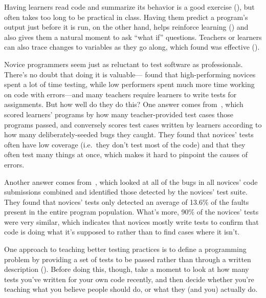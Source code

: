 Having learners read code and summarize its behavior is a good exercise (),
but often takes too long to be practical in class.
Having them predict a program's output just before it is run,
on the other hand,
helps reinforce learning ()
and also gives them a natural moment to ask ``what if'' questions.
Teachers or learners can also trace changes to variables as they go along,
which \cite{Cunn2017} found was effective ().


Novice programmers seem just as reluctant to test software as professionals.
There's no doubt that doing it is valuable---\cite{Cart2017} found that
high-performing novices spent a lot of time testing,
while low performers spent much more time working on code with errors---and many teachers
require learners to write tests for assignments.
But how well do they do this?
One answer comes from~\cite{Bria2015},
which scored learners' programs by how many teacher-provided test cases those programs passed,
and conversely scores test cases written by learners according to how many deliberately-seeded bugs they caught.
They found that novices' tests often have low coverage (i.e.\ they don't test most of the code)
and that they often test many things at once, which makes it hard to pinpoint the causes of errors.

Another answer comes from~\cite{Edwa2014b},
which looked at all of the bugs in all novices' code submissions combined
and identified those detected by the novices' test suite.
They found that novices' tests only detected an average of 13.6\% of the faults present in the entire program population.
What's more,
90\% of the novices' tests were very similar,
which indicates that novices mostly write tests to confirm that code is doing what it's supposed to
rather than to find cases where it isn't.

One approach to teaching better testing practices is
to define a programming problem by providing a set of tests to be passed
rather than through a written description ().
Before doing this,
though,
take a moment to look at how many tests you've written for your own code recently,
and then decide whether you're teaching what you believe people should do,
or what they (and you) actually do.


